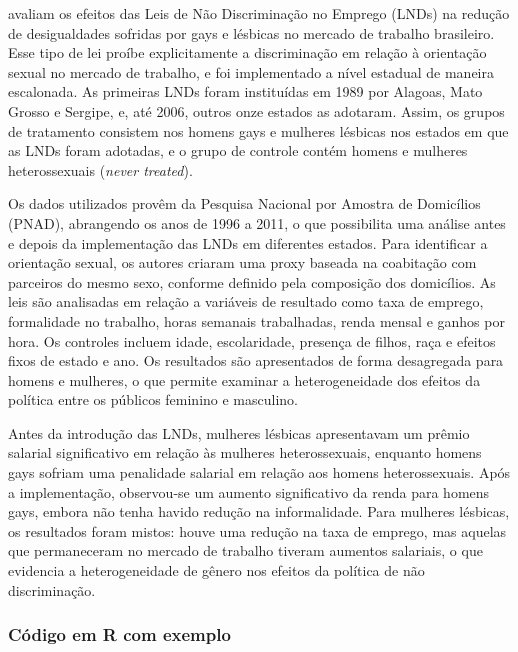 \documentclass[portugues]{article}
\begin{document}
\begin{boxaplicado}
    \cite{gravestrond} avaliam os efeitos das Leis de Não Discriminação no Emprego (LNDs) na redução de desigualdades sofridas por gays e lésbicas no mercado de trabalho brasileiro. Esse tipo de lei proíbe explicitamente a discriminação em relação à orientação sexual no mercado de trabalho, e foi implementado a nível estadual de maneira escalonada. As primeiras LNDs foram instituídas em 1989 por Alagoas, Mato Grosso e Sergipe, e, até 2006, outros onze estados as adotaram. Assim, os grupos de tratamento consistem nos homens gays e mulheres lésbicas nos estados em que as LNDs foram adotadas, e o grupo de controle contém homens e mulheres heterossexuais (\textit{never treated}).

Os dados utilizados provêm da Pesquisa Nacional por Amostra de Domicílios (PNAD), abrangendo os anos de 1996 a 2011, o que possibilita uma análise antes e depois da implementação das LNDs em diferentes estados. Para identificar a orientação sexual, os autores criaram uma proxy baseada na coabitação com parceiros do mesmo sexo, conforme definido pela composição dos domicílios.
As leis são analisadas em relação a variáveis de resultado como taxa de emprego, formalidade no trabalho, horas semanais trabalhadas, renda mensal e ganhos por hora. Os controles incluem idade, escolaridade, presença de filhos, raça e efeitos fixos de estado e ano. Os resultados são apresentados de forma desagregada para homens e mulheres, o que permite examinar a heterogeneidade dos efeitos da política entre os públicos feminino e masculino.

Antes da introdução das LNDs, mulheres lésbicas apresentavam um prêmio salarial significativo em relação às mulheres heterossexuais, enquanto homens gays sofriam uma penalidade salarial em relação aos homens heterossexuais. Após a implementação, observou-se um aumento significativo da renda para homens gays, embora não tenha havido redução na informalidade. Para mulheres lésbicas, os resultados foram mistos: houve uma redução na taxa de emprego, mas aquelas que permaneceram no mercado de trabalho tiveram aumentos salariais, o que evidencia a heterogeneidade de gênero nos efeitos da política de não discriminação.

\end{boxaplicado}

\subsubsection{Código em R com exemplo}
\end{document}
